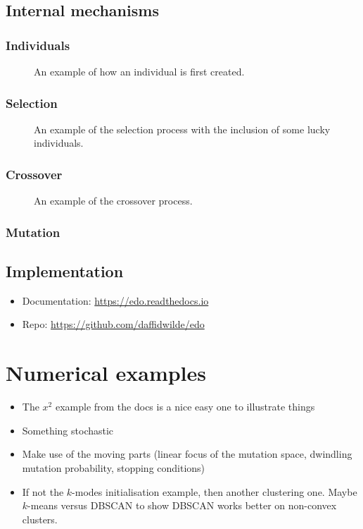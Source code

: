 \documentclass[10pt]{article}
\newlength{\imgwidth}
\newcommand{\inputtikz}[3][\imgwidth]{%
    \begin{figure}[htbp]
        \centering
        \resizebox{#1}{!}{%
            
        }
        \caption{#3}
    \end{figure}
}
\begin{document}
\subsection{Internal mechanisms}\label{subsection:mechanisms}

\subsubsection{Individuals}

\inputtikz{individual.tex}{%
    An example of how an individual is first created.
}

\subsubsection{Selection}

\inputtikz{selection.tex}{%
    An example of the selection process with the inclusion of some lucky
    individuals.
}

\subsubsection{Crossover}

\inputtikz{crossover.tex}{An example of the crossover process.}

\subsubsection{Mutation}

\subsection{Implementation}\label{subsection:implementation}

\begin{itemize}
    \item Documentation: \url{https://edo.readthedocs.io}
    \item Repo: \url{https://github.com/daffidwilde/edo}
\end{itemize}


\section{Numerical examples}\label{section:examples}

\begin{itemize}
    \item The \(x^2\) example from the docs is a nice easy one to illustrate
        things
    \item Something stochastic
    \item Make use of the moving parts (linear focus of the mutation space,
        dwindling mutation probability, stopping conditions)
    \item If not the \(k\)-modes initialisation example, then another clustering
        one. Maybe \(k\)-means versus DBSCAN to show DBSCAN works better on
        non-convex clusters.
\end{itemize}
\end{document}
